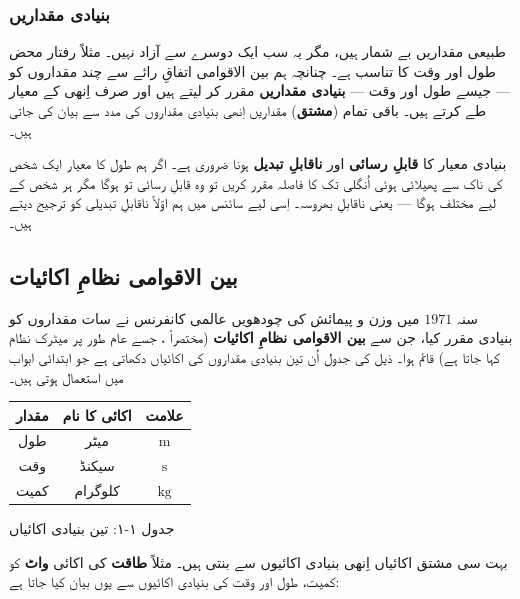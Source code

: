 \documentclass{urdu-textbook}
\begin{document}
\hypertarget{ux628ux646ux6ccux627ux62fux6cc-ux645ux642ux62fux627ux631ux6ccux6ba}{%
\subsubsection{بنیادی
مقداریں}\label{ux628ux646ux6ccux627ux62fux6cc-ux645ux642ux62fux627ux631ux6ccux6ba}}

طبیعی مقداریں بے شمار ہیں، مگر یہ سب ایک دوسرے سے آزاد نہیں۔ مثلاً رفتار
محض طول اور وقت کا تناسب ہے۔ چنانچہ ہم بین الاقوامی اتفاقِ رائے سے چند
مقداروں کو --- جیسے طول اور وقت --- \textbf{بنیادی مقداریں} مقرر کر لیتے
ہیں اور صرف اِنھی کے معیار طے کرتے ہیں۔ باقی تمام (\textbf{مشتق}) مقداریں
اِنھی بنیادی مقداروں کی مدد سے بیان کی جاتی ہیں۔

بنیادی معیار کا \textbf{قابلِ رسائی} اور \textbf{ناقابلِ تبدیل} ہونا ضروری
ہے۔ اگر ہم طول کا معیار ایک شخص کی ناک سے پھیلائی ہوئی اُنگلی تک کا فاصلہ
مقرر کریں تو وہ قابلِ رسائی تو ہوگا مگر ہر شخص کے لیے مختلف ہوگا --- یعنی
ناقابلِ بھروسہ۔ اِسی لیے سائنس میں ہم اوّلاً ناقابلِ تبدیلی کو ترجیح دیتے
ہیں۔

\hypertarget{ux628ux6ccux646-ux627ux644ux627ux642ux648ux627ux645ux6cc-ux646ux638ux627ux645-ux627ux6a9ux627ux626ux6ccux627ux62a-si}{%
\subsection{بین الاقوامی نظامِ اکائیات
}\label{ux628ux6ccux646-ux627ux644ux627ux642ux648ux627ux645ux6cc-ux646ux638ux627ux645-ux627ux6a9ux627ux626ux6ccux627ux62a-si}}

سنہ \(1971\) میں وزن و پیمائش کی چودھویں عالمی کانفرنس نے سات مقداروں کو
بنیادی مقرر کیا، جن سے \textbf{بین الاقوامی نظامِ اکائیات} (مختصراً ،
جسے عام طور پر میٹرک نظام کہا جاتا ہے) قائم ہوا۔ ذیل کی جدول اُن تین
بنیادی مقداروں کی اکائیاں دکھاتی ہے جو ابتدائی ابواب میں استعمال ہوتی
ہیں۔

\begin{longtable}[]{@{}ccc@{}}
\toprule\noalign{}
مقدار & اکائی کا نام & علامت \\
\midrule\noalign{}
\endhead
\bottomrule\noalign{}
\endlastfoot
طول & میٹر & \(\mathrm{m}\) \\
وقت & سیکنڈ & \(\mathrm{s}\) \\
کمیت & کلوگرام & \(\mathrm{kg}\) \\
\end{longtable}

جدول ۱-۱: تین بنیادی  اکائیاں

بہت سی مشتق  اکائیاں اِنھی بنیادی اکائیوں سے بنتی ہیں۔ مثلاً
\textbf{طاقت}  کی اکائی \textbf{واٹ}  کو کمیت، طول اور وقت کی
بنیادی اکائیوں سے یوں بیان کیا جاتا ہے:
\end{document}
